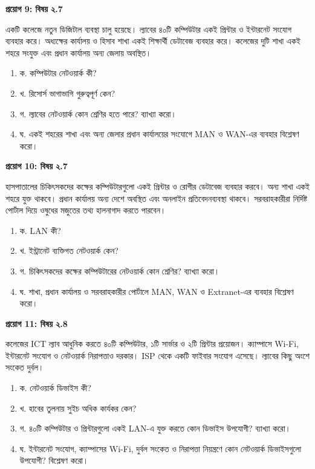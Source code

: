 \par{}
\textbf{প্রয়োগ 9: বিষয় ২.7}\par
\par
একটি কলেজে নতুন ডিজিটাল ব্যবস্থা চালু হয়েছে। ল্যাবের ৪০টি কম্পিউটার একই প্রিন্টার ও ইন্টারনেট সংযোগ ব্যবহার করে। অধ্যক্ষের কার্যালয় ও হিসাব শাখা একই শিক্ষার্থী ডেটাবেজ ব্যবহার করে। কলেজের দুটি শাখা একই শহরে সংযুক্ত এবং প্রধান কার্যালয় অন্য জেলায় অবস্থিত।

\begin{enumerate}
\item ক. কম্পিউটার নেটওয়ার্ক কী?
\item খ. রিসোর্স ভাগাভাগি গুরুত্বপূর্ণ কেন?
\item গ. ল্যাবের নেটওয়ার্ক কোন শ্রেণির হতে পারে? ব্যাখ্যা করো।
\item ঘ. একই শহরের শাখা এবং অন্য জেলার প্রধান কার্যালয়ের সংযোগে MAN ও WAN-এর ব্যবহার বিশ্লেষণ করো।
\end{enumerate}
\par

\par{}
\textbf{প্রয়োগ 10: বিষয় ২.7}\par
হাসপাতালের চিকিৎসকদের কক্ষের কম্পিউটারগুলো একই প্রিন্টার ও রোগীর ডেটাবেজ ব্যবহার করবে। অন্য শাখা একই শহরে যুক্ত থাকবে। প্রধান কার্যালয় অন্য দেশে অবস্থিত এবং অনলাইন প্রতিবেদনব্যবস্থা থাকবে। সরবরাহকারীরা নির্দিষ্ট পোর্টাল দিয়ে ওষুধের মজুতের তথ্য হালনাগাদ করতে পারবেন।

\begin{enumerate}
\item ক. LAN কী?
\item খ. ইন্ট্রানেট ব্যক্তিগত নেটওয়ার্ক কেন?
\item গ. চিকিৎসকদের কক্ষের কম্পিউটারের নেটওয়ার্ক কোন শ্রেণির? ব্যাখ্যা করো।
\item ঘ. শাখা, প্রধান কার্যালয় ও সরবরাহকারীর পোর্টালে MAN, WAN ও Extranet-এর ব্যবহার বিশ্লেষণ করো।
\end{enumerate}
\par

\par{}
\textbf{প্রয়োগ 11: বিষয় ২.8}\par
\par
কলেজের ICT ল্যাব আধুনিক করতে ৪০টি কম্পিউটার, ১টি সার্ভার ও ২টি প্রিন্টার প্রয়োজন। ক্যাম্পাসে Wi-Fi, ইন্টারনেট সংযোগ ও নেটওয়ার্ক নিরাপত্তাও দরকার। ISP থেকে একটি ফাইবার সংযোগ এসেছে। ল্যাবের কিছু অংশে সংকেত দুর্বল।

\begin{enumerate}
\item ক. নেটওয়ার্ক ডিভাইস কী?
\item খ. হাবের তুলনায় সুইচ অধিক কার্যকর কেন?
\item গ. ৪০টি কম্পিউটার ও প্রিন্টারগুলো একই LAN-এ যুক্ত করতে কোন ডিভাইস উপযোগী? ব্যাখ্যা করো।
\item ঘ. ইন্টারনেট সংযোগ, ক্যাম্পাসের Wi-Fi, দুর্বল সংকেত ও নিরাপত্তা নিয়ন্ত্রণে কোন নেটওয়ার্ক ডিভাইসগুলো উপযোগী? বিশ্লেষণ করো।
\end{enumerate}
\par

